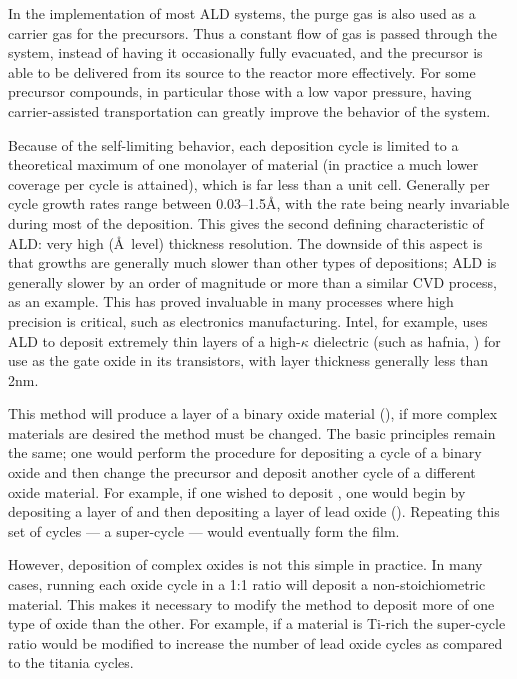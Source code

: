 In the implementation of most ALD systems, the purge gas is also used as a carrier gas for the precursors. Thus a constant flow of gas is passed through the system, instead of having it occasionally fully evacuated, and the precursor is able to be delivered from its source to the reactor more effectively. For some precursor compounds, in particular those with a low vapor pressure, having carrier-assisted transportation can greatly improve the behavior of the system. 

Because of the self-limiting behavior, each deposition cycle is limited to a theoretical maximum of one monolayer of material (in practice a much lower coverage per cycle is attained), which is far less than a unit cell. Generally per cycle growth rates range between 0.03--1.5\AA{}, with the rate being nearly invariable during most of the deposition. This gives the second defining characteristic of ALD: very high (\AA\ level) thickness resolution. The downside of this aspect is that growths are generally much slower than other types of depositions; ALD is generally slower by an order of magnitude or more than a similar CVD process, as an example. This has proved invaluable in many processes where high precision is critical, such as electronics manufacturing. Intel, for example, uses ALD to deposit extremely thin layers of a high-$\kappa$ dielectric (such as hafnia, ) for use as the gate oxide in its transistors, with layer thickness generally less than 2nm. 

This method will produce a layer of a binary oxide material (), if more complex materials are desired the method must be changed. The basic principles remain the same; one would perform the procedure for depositing a cycle of a binary oxide and then change the precursor and deposit another cycle of a different oxide material. For example, if one wished to deposit \PTO{}, one would begin by depositing a layer of  and then depositing a layer of lead oxide (). Repeating this set of cycles --- a super-cycle --- would eventually form the \PTO{} film. 

However, deposition of complex oxides is not this simple in practice. In many cases, running each oxide cycle in a 1:1 ratio will deposit a non-stoichiometric material. This makes it necessary to modify the method to deposit more of one type of oxide than the other. For example, if a material is Ti-rich the super-cycle ratio would be modified to increase the number of lead oxide cycles as compared to the titania cycles. 

